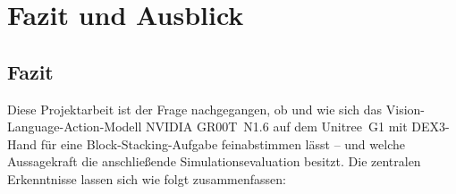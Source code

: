 
\chapter{Fazit und Ausblick}
\label{chap:fazit}

\section{Fazit}
\label{sec:fazit}

Diese Projektarbeit ist der Frage nachgegangen, ob und wie sich das
Vision-Language-Action-Modell NVIDIA GR00T~N1.6 auf dem Unitree~G1 mit DEX3-Hand
für eine Block-Stacking-Aufgabe feinabstimmen lässt -- und welche Aussagekraft die
anschließende Simulationsevaluation besitzt. Die zentralen Erkenntnisse lassen
sich wie folgt zusammenfassen:

